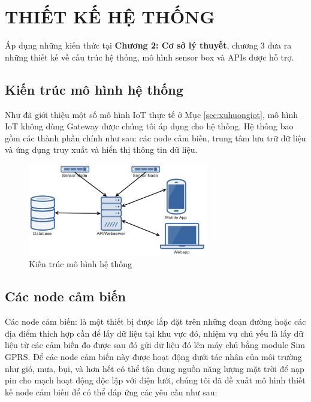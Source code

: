 \ifpdf
\graphicspath{{Chapter3/Figs/Raster/}{Chapter3/Figs/PDF/}{Chapter3/Figs/}{Chapter3/Figs/Web/}{Chapter3/Figs/Server/}{Chapter3/Figs/Mobile/}}
\else
\graphicspath{{Chapter3/Figs/Vector/}{Chapter3/Figs/}}
\fi

\chapter{THIẾT KẾ HỆ THỐNG}\label{chap: design}
Áp dụng những kiến thức tại \textbf{Chương 2: Cơ sở lý thuyết}, chương 3 đưa ra những thiết kế về cấu trúc hệ thống, mô hình sensor box và APIs được hỗ trợ.
\section{Kiến trúc mô hình hệ thống}\label{sec:struc}
Như đã giới thiệu một số mô hình IoT thực tế ở Mục \ref{sec:xuhuongiot}, mô hình IoT không dùng Gateway được chúng tôi áp dụng cho hệ thống. Hệ thống bao gồm các thành phần chính như sau: các node cảm biến, trung tâm lưu trữ dữ liệu và ứng dụng truy xuất và hiển thị thông tin dữ liệu.
\begin{figure}[H]
	\centering    
	\includegraphics[width=0.7\textwidth]{model}
	\caption[Kiến trúc mô hình hệ thống]{Kiến trúc mô hình hệ thống}
	\label{fig:system}
\end{figure}

\section{Các node cảm biến}\label{sec:cacloaicambien}
Các node cảm biến: là một thiết bị được lắp đặt trên những đoạn đường hoặc các địa điểm thích hợp cần để lấy dữ liệu tại khu vực đó, nhiệm vụ chủ yếu là lấy dữ liệu từ các cảm biến đo được sau đó gửi dữ liệu đó lên máy chủ bằng module Sim GPRS.
Để các node cảm biến này được hoạt động dưới tác nhân của môi trường như gió, mưa, bụi, và hơn hết có thể tận dụng nguồn năng lượng mặt trời để nạp pin cho mạch hoạt động độc lập với điện lưới, chúng tôi đã đề xuất mô hình thiết kế node cảm biến để có thể đáp ứng các yêu cầu như sau:

